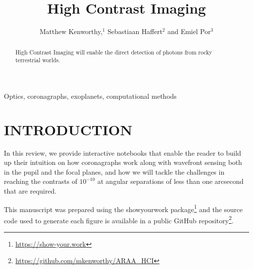 \documentclass[letterpaper]{ar-1col}
\newcommand{\project}[1]{\textsf{#1}}
\begin{document}

\title{High Contrast Imaging}

\author{Matthew Kenworthy,$^1$ Sebastiaan Haffert$^2$ and Emiel Por$^3$
  }

\begin{abstract}
High Contrast Imaging will enable the direct detection of photons from rocky terrestrial worlds.
\end{abstract}

\begin{keywords}
 Optics, coronagraphs, exoplanets, computational methods

\end{keywords}
\maketitle

\tableofcontents

\section{INTRODUCTION}
\label{sec:intro}



In this review, we provide interactive notebooks that enable the reader to build up their intuition on how coronagraphs work along with wavefront sensing both in the pupil and the focal planes, and how we will tackle the challenges in reaching the contrasts of $10^{-10}$ at angular separations of less than one arcsecond that are required.


\begin{armarginnote}[]
\end{armarginnote}

This manuscript was prepared using the \project{showyourwork} package\footnote{\url{https://show-your.work}} and the source code used to generate each figure is available in a public \project{GitHub} repository\footnote{\url{https://github.com/mkenworthy/ARAA_HCI}}.
\end{document}
